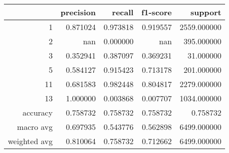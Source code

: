 \begin{tabular}{rrrrr}
\toprule
 & precision & recall & f1-score & support \\
\midrule
1 & 0.871024 & 0.973818 & 0.919557 & 2559.000000 \\
2 & nan & 0.000000 & nan & 395.000000 \\
3 & 0.352941 & 0.387097 & 0.369231 & 31.000000 \\
5 & 0.584127 & 0.915423 & 0.713178 & 201.000000 \\
11 & 0.681583 & 0.982448 & 0.804817 & 2279.000000 \\
13 & 1.000000 & 0.003868 & 0.007707 & 1034.000000 \\
accuracy & 0.758732 & 0.758732 & 0.758732 & 0.758732 \\
macro avg & 0.697935 & 0.543776 & 0.562898 & 6499.000000 \\
weighted avg & 0.810064 & 0.758732 & 0.712662 & 6499.000000 \\
\bottomrule
\end{tabular}

